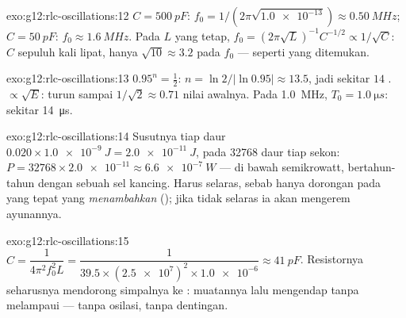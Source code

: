 \begin{solution}{exo:g12:rlc-oscillations:12}
$C = \qty{500}{pF}$: $f_0 = 1/(2\pi\sqrt{\num{1.0e-13}}) \approx
\qty{0.50}{MHz}$; $C = \qty{50}{pF}$: $f_0 \approx \qty{1.6}{MHz}$.
Pada $L$ yang tetap, $f_0 = (2\pi\sqrt{L})^{-1} C^{-1/2} \propto 1/\sqrt{C}$:
$C$ sepuluh kali lipat, hanya $\sqrt{10} \approx 3.2$ pada $f_0$ --- seperti yang ditemukan.
\end{solution}

\begin{solution}{exo:g12:rlc-oscillations:13}
$0.95^n = \tfrac12$: $n = \ln 2/\lvert\ln 0.95\rvert \approx 13.5$,
jadi sekitar $14$ .  $\propto \sqrt{E}$: turun sampai
$1/\sqrt{2} \approx 0.71$ nilai awalnya. Pada \qty{1.0}{MHz},
$T_0 = \qty{1.0}{\micro s}$: sekitar \qty{14}{\micro s}.
\end{solution}

\begin{solution}{exo:g12:rlc-oscillations:14}
Susutnya tiap daur $0.020 \times \qty{1.0e-9}{J} = \qty{2.0e-11}{J}$, pada
\num{32768} daur tiap sekon: $P = \num{32768} \times \num{2.0e-11}
\approx \qty{6.6e-7}{W}$ --- di bawah semikrowatt, bertahun-tahun dengan sebuah
sel kancing. Harus selaras, sebab hanya dorongan pada  yang tepat yang
\emph{menambahkan}  (); jika tidak selaras ia akan mengerem ayunannya.
\end{solution}

\begin{solution}{exo:g12:rlc-oscillations:15}
$C = \dfrac{1}{4\pi^2 f_0^2 L} = \dfrac{1}{39.5 \times
(\num{2.5e7})^2 \times \num{1.0e-6}} \approx \qty{41}{pF}$.
Resistornya seharusnya mendorong simpalnya ke : muatannya
lalu mengendap tanpa melampaui --- tanpa osilasi, tanpa dentingan.
\end{solution}

